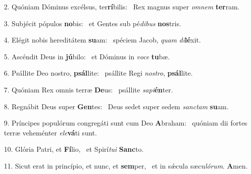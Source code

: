 2. Quóniam Dóminus excélsus, ter\textbf{rí}bilis: \ast\  Rex magnus super \textit{om}\textit{nem} \textbf{ter}ram.\

3. Subjécit pópulos \textbf{no}bis: \ast\  et Gentes sub pé\textit{di}\textit{bus} \textbf{nos}tris.\

4. Elégit nobis hereditátem \textbf{su}am: \ast\  spéciem Jacob, \textit{quam} \textit{di}\textbf{lé}xit.\

5. Ascéndit Deus in \textbf{jú}bilo: \ast\  et Dóminus in \textit{vo}\textit{ce} \textbf{tu}bæ.\

6. Psállite Deo nostro, \textbf{psál}lite: \ast\  psállite Regi \textit{nos}\textit{tro}, \textbf{psál}lite.\

7. Quóniam Rex omnis terræ \textbf{De}us: \ast\  psállite \textit{sa}\textit{pi}\textbf{én}ter.\

8. Regnábit Deus super \textbf{Gen}tes: \ast\  Deus sedet super sedem \textit{sanc}\textit{tam} \textbf{su}am.\

9. Príncipes populórum congregáti sunt cum Deo \textbf{A}braham: \ast\  quóniam dii fortes terræ veheménter \textit{e}\textit{le}\textbf{vá}ti sunt.\

10. Glória Patri, et \textbf{Fí}lio, \ast\  et Spirí\textit{tu}\textit{i} \textbf{Sanc}to.\

11. Sicut erat in princípio, et nunc, et \textbf{sem}per, \ast\  et in sǽcula sæcu\textit{ló}\textit{rum}. \textbf{A}men.\

